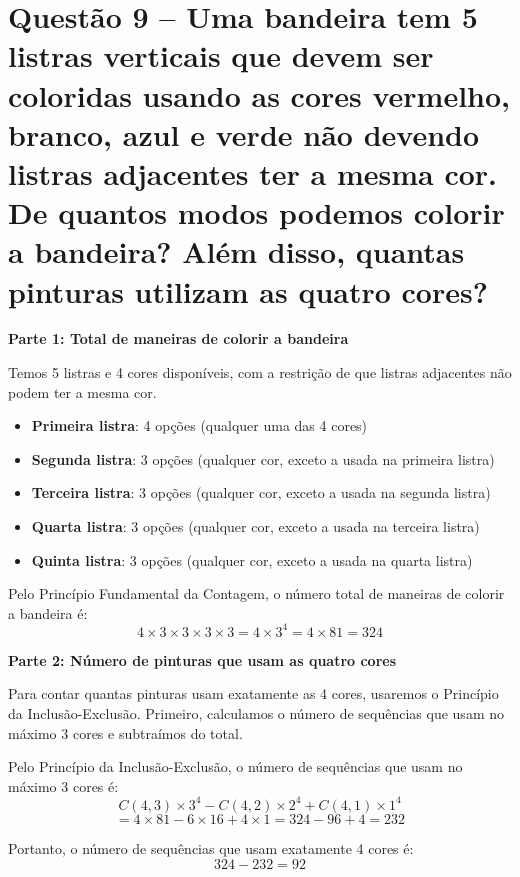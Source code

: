 \documentclass[12pt,a4paper]{article}
\begin{document}
\section*{Questão 9 -- Uma bandeira tem 5 listras verticais que devem ser coloridas usando as
cores vermelho, branco, azul e verde não devendo listras adjacentes ter a
mesma cor. De quantos modos podemos colorir a bandeira? Além disso,
quantas pinturas utilizam as quatro cores?}
    
    \vspace{0.5cm}
    
    \textbf{Parte 1: Total de maneiras de colorir a bandeira}
    
    Temos 5 listras e 4 cores disponíveis, com a restrição de que listras adjacentes não podem ter a mesma cor.
    
    \begin{itemize}
        \item \textbf{Primeira listra}: 4 opções (qualquer uma das 4 cores)
        \item \textbf{Segunda listra}: 3 opções (qualquer cor, exceto a usada na primeira listra)
        \item \textbf{Terceira listra}: 3 opções (qualquer cor, exceto a usada na segunda listra)
        \item \textbf{Quarta listra}: 3 opções (qualquer cor, exceto a usada na terceira listra)
        \item \textbf{Quinta listra}: 3 opções (qualquer cor, exceto a usada na quarta listra)
    \end{itemize}
    
    Pelo Princípio Fundamental da Contagem, o número total de maneiras de colorir a bandeira é:
    \[
    4 \times 3 \times 3 \times 3 \times 3 = 4 \times 3^4 = 4 \times 81 = 324
    \]
    
    \textbf{Parte 2: Número de pinturas que usam as quatro cores}
    
    Para contar quantas pinturas usam exatamente as 4 cores, usaremos o Princípio da Inclusão-Exclusão. Primeiro, calculamos o número de sequências que usam no máximo 3 cores e subtraímos do total.
    
    Pelo Princípio da Inclusão-Exclusão, o número de sequências que usam no máximo 3 cores é:
    \[
    C(4,3) \times 3^4 - C(4,2) \times 2^4 + C(4,1) \times 1^4
    \]
    \[
    = 4 \times 81 - 6 \times 16 + 4 \times 1 = 324 - 96 + 4 = 232
    \]
    
    Portanto, o número de sequências que usam exatamente 4 cores é:
    \[
    324 - 232 = 92
    \]
    
\end{document}
